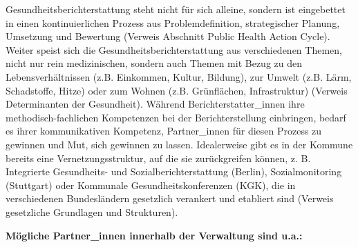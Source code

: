 \documentclass{article}
\begin{document}
Gesundheitsberichterstattung steht nicht für sich alleine, sondern ist eingebettet in einen kontinuierlichen Prozess aus Problemdefinition, strategischer Planung, Umsetzung und Bewertung (Verweis Abschnitt Public Health Action Cycle). Weiter speist sich die Gesundheitsberichterstattung aus verschiedenen Themen, nicht nur rein medizinischen, sondern auch Themen mit Bezug zu den Lebensverhältnissen (z.B. Einkommen, Kultur, Bildung), zur Umwelt (z.B. Lärm, Schadstoffe, Hitze) oder zum Wohnen (z.B. Grünflächen, Infrastruktur) (Verweis Determinanten der Gesundheit). Während Berichterstatter\_innen ihre methodisch-fachlichen Kompetenzen bei der Berichterstellung einbringen, bedarf es ihrer kommunikativen Kompetenz, Partner\_innen für diesen Prozess zu gewinnen und Mut, sich gewinnen zu lassen. Idealerweise gibt es in der Kommune bereits eine Vernetzungsstruktur, auf die sie zurückgreifen können, z. B. Integrierte Gesundheits- und Sozialberichterstattung (Berlin), Sozialmonitoring (Stuttgart) oder Kommunale Gesundheitskonferenzen (KGK), die in verschiedenen Bundesländern gesetzlich verankert und etabliert sind (Verweis gesetzliche Grundlagen und Strukturen). 


\textbf{Mögliche Partner\_innen innerhalb der Verwaltung sind u.a.:}
\end{document}
